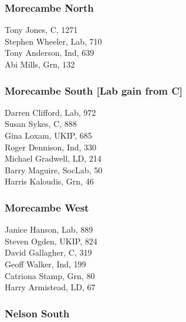 \documentclass[a4paper,openany,10pt]{book}
\begin{document}
\subsubsection*{Morecambe North}



Tony Jones, C, 1271\\
Stephen Wheeler, Lab, 710\\
Tony Anderson, Ind, 639\\
Abi Mills, Grn, 132\\


\subsubsection*{Morecambe South \hspace*{\fill}\nolinebreak[1]%
\enspace\hspace*{\fill}
[Lab gain from C]}



Darren Clifford, Lab, 972\\
Susan Sykes, C, 888\\
Gina Loxam, UKIP, 685\\
Roger Dennison, Ind, 330\\
Michael Gradwell, LD, 214\\
Barry Maguire, SocLab, 50\\
Harris Kaloudis, Grn, 46\\


\subsubsection*{Morecambe West}



Janice Hanson, Lab, 889\\
Steven Ogden, UKIP, 824\\
David Gallagher, C, 319\\
Geoff Walker, Ind, 199\\
Catriona Stamp, Grn, 80\\
Harry Armistead, LD, 67\\


\subsubsection*{Nelson South}
\end{document}
